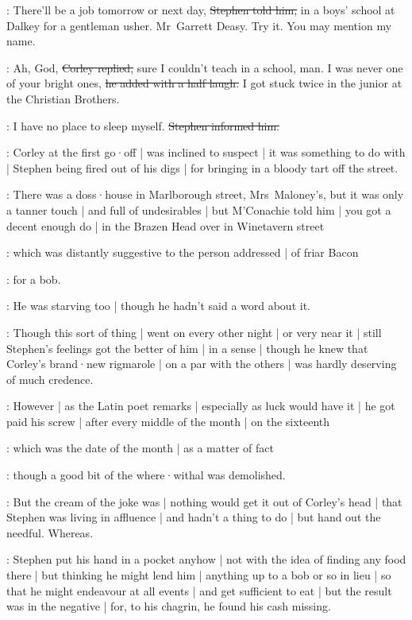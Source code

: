 \Stephen:
There'll be a job tomorrow or next day,
\sout{Stephen told him,}
in a boys' school at Dalkey for a gentleman usher.
Mr~Garrett Deasy.
Try it.
You may mention my name.

\LordJohnCorley:
Ah,
God,
\sout{Corley replied,}
sure I couldn't teach in a school,
man.
I was never one of your bright ones,
\sout{he added with a half laugh.}
I got stuck twice in the junior at the Christian Brothers.

\Stephen:
I have no place to sleep myself.
\sout{Stephen informed him.}

:
Corley at the first go·off |
was inclined to suspect |
it was something to do with |
Stephen being fired out of his digs |
for bringing in a bloody tart off the street.

:
There was a doss·house in Marlborough street,
Mrs~Maloney's,
but it was only a tanner touch |
and full of undesirables |
but M'Conachie told him |
you got a decent enough do |
in the Brazen Head over in Winetavern street

:
which was distantly suggestive to the person addressed |
of friar Bacon

:
for a bob.%

:
He was starving too |
though he hadn't said a word about it.

:
Though this sort of thing |
went on every other night |
or very near it |
still Stephen's feelings got the better of him |
in a sense |
though he knew that Corley's brand·new rigmarole |
on a par with the others |
was hardly deserving of much credence.

:
However  |
as the Latin poet remarks |
especially as luck would have it |
he got paid his screw |
after every middle of the month |
on the sixteenth

:
which was the date of the month |
as a matter of fact

:
though a good bit of the where·withal was demolished.

:
But the cream of the joke was |
nothing would get it out of Corley's head |
that Stephen was living in affluence |
and hadn't a thing to do |
but hand out the needful.
Whereas.%

:
Stephen put his hand in a pocket anyhow |
not with the idea of finding any food there |
but thinking he might lend him |
anything up to a bob or so in lieu |
so that he might endeavour at all events |
and get sufficient to eat |
but the result was in the negative |
for,
to his chagrin,
he found his cash missing.

